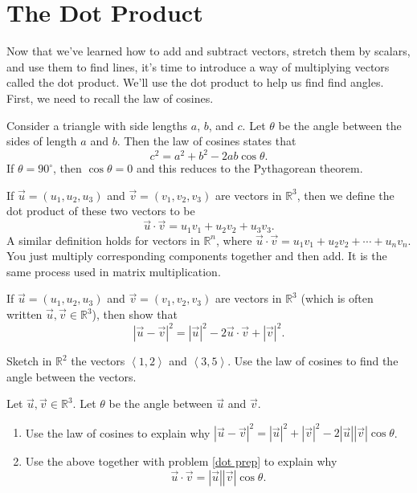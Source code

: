 \section{The Dot Product}
Now that we've learned how to add and subtract vectors, stretch them by scalars, and use them to find lines, it's time to introduce a way of multiplying vectors called the dot product.  We'll use the dot product to help us find find angles. First, we need to recall the law of cosines.
\begin{theorem*}
Consider a triangle with side lengths $a$, $b$, and $c$. Let $\theta$ be the angle between the sides of length $a$ and $b$. Then the law of cosines states that 
$$c^2=a^2+b^2-2ab\cos\theta.$$
If $\theta=90^\circ$, then $\cos\theta=0$ and this reduces to the Pythagorean theorem.
\end{theorem*}

\begin{definition}
If $\vec u = (u_1,u_2,u_3)$ and $\vec v= (v_1,v_2,v_3)$ are vectors in $\mathbb{R}^3$, then we define the dot product of these two vectors to be 
$$\vec u\cdot \vec v = u_1 v_1+ u_2 v_2+ u_3 v_3.$$
A similar definition holds for vectors in $\mathbb{R}^n$, where
$\vec u\cdot \vec v = u_1 v_1+ u_2 v_2+\cdots+ u_n v_n.$
You just multiply corresponding components together and then add. It is the same process used in matrix multiplication.
\end{definition}

\begin{problem}\label{dot prep} 
If $\vec u = (u_1,u_2,u_3)$ and $\vec v= (v_1,v_2,v_3)$ are vectors in $\mathbb{R}^3$ (which is often written $\vec u,\vec v\in\mathbb{R}^3$), then show that 
$$|\vec u-\vec v|^2 = |\vec u|^2-2\vec u\cdot \vec v +|\vec v|^2.$$
\end{problem}

\begin{problem} 
%
Sketch in $\mathbb{R}^2$ the vectors $\left<1,2\right>$ and $\left<3,5\right>$.  Use the law of cosines to find the angle between the vectors.
\end{problem}


\begin{problem}\label{dot angle formula}  
%
Let $\vec u,\vec v\in\mathbb{R}^3$. Let $\theta$ be the angle between $\vec u$ and $\vec v$. 
\begin{enumerate}
\item Use the law of cosines to explain why $|\vec u-\vec v|^2=|\vec u|^2+|\vec v|^2-2|\vec u||\vec v|\cos\theta$.
\item Use the above together with problem \ref{dot prep} to explain why $$\vec u\cdot \vec v=|\vec u||\vec v|\cos\theta.$$
\end{enumerate}
\end{problem}

